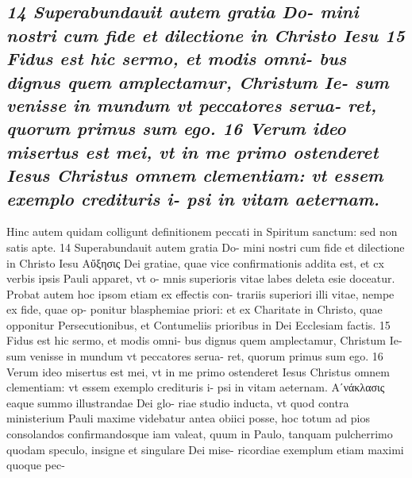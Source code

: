 \documentclass{article}
\begin{document}
\begin{pages}
\subsection*{\textit{14 Superabundauit autem gratia Do- mini nostri cum fide et dilectione in Christo Iesu 15 Fidus est hic sermo, et modis omni- bus dignus quem amplectamur, Christum Ie- sum venisse in mundum vt peccatores serua- ret, quorum primus sum ego. 16 Verum ideo misertus est mei, vt in me primo ostenderet Iesus Christus omnem clementiam: vt essem exemplo credituris i- psi in vitam aeternam.}}Hinc autem quidam colligunt definitionem peccati in Spiritum sanctum: sed non satis apte.  14 Superabundauit autem gratia Do- mini nostri cum fide et dilectione in Christo Iesu Αὔξησις Dei gratiae, quae vice confirmationis addita est, et cx verbis ipsis Pauli apparet, vt o- mnis superioris vitae labes deleta esie doceatur. Probat autem hoc ipsom etiam ex effectis con- trariis superiori illi vitae, nempe ex fide, quae op- ponitur blasphemiae priori: et ex Charitate in Christo, quae opponitur Persecutionibus, et Contumeliis prioribus in Dei Ecclesiam factis. 15 Fidus est hic sermo, et modis omni- bus dignus quem amplectamur, Christum Ie- sum venisse in mundum vt peccatores serua- ret, quorum primus sum ego. 16 Verum ideo misertus est mei, vt in me primo ostenderet Iesus Christus omnem clementiam: vt essem exemplo credituris i- psi in vitam aeternam. Αʹνάκλασις eaque summo illustrandae Dei glo- riae studio inducta, vt quod contra ministerium Pauli maxime videbatur antea obiici posse, hoc totum ad pios consolandos confirmandosque iam valeat, quum in Paulo, tanquam pulcherrimo quodam speculo, insigne et singulare Dei mise- ricordiae exemplum etiam maximi quoque pec-  \pend

\end{pages}
\end{document}
